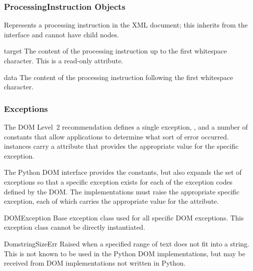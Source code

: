 \subsubsection{ProcessingInstruction Objects \label{dom-pi-objects}}

Represents a processing instruction in the XML document; this inherits
from the  interface and cannot have child nodes.

\begin{memberdesc}[ProcessingInstruction]{target}
The content of the processing instruction up to the first whitespace
character.  This is a read-only attribute.
\end{memberdesc}

\begin{memberdesc}[ProcessingInstruction]{data}
The content of the processing instruction following the first
whitespace character.
\end{memberdesc}


\subsubsection{Exceptions \label{dom-exceptions}}


The DOM Level~2 recommendation defines a single exception,
, and a number of constants that allow
applications to determine what sort of error occurred.
 instances carry a  attribute
that provides the appropriate value for the specific exception.

The Python DOM interface provides the constants, but also expands the
set of exceptions so that a specific exception exists for each of the
exception codes defined by the DOM.  The implementations must raise
the appropriate specific exception, each of which carries the
appropriate value for the  attribute.

\begin{excdesc}{DOMException}
  Base exception class used for all specific DOM exceptions.  This
  exception class cannot be directly instantiated.
\end{excdesc}

\begin{excdesc}{DomstringSizeErr}
  Raised when a specified range of text does not fit into a string.
  This is not known to be used in the Python DOM implementations, but
  may be received from DOM implementations not written in Python.
\end{excdesc}

